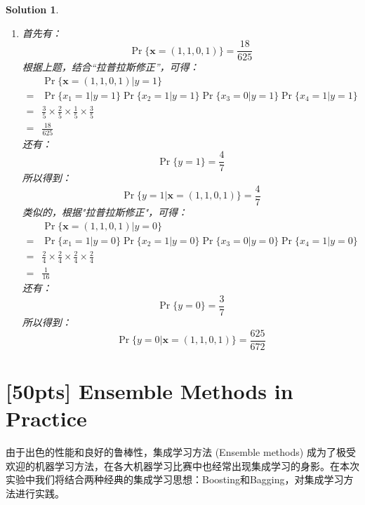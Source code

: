 \documentclass[a4paper,UTF8]{article}
\numberwithin{equation}{section}
\newtheorem*{mySol}{Solution}
\begin{document}
\begin{mySol}
\begin{enumerate}[ {(}1{)}]
\item 
首先有：
\begin{equation}
\Pr\{\mathbf{x}=(1,1,0,1)\} = \frac{18}{625}
\end{equation}
根据上题，结合“拉普拉斯修正”，可得：
\begin{equation}
\begin{aligned}
&\Pr\{\mathbf{x}=(1,1,0,1) | y=1  \}\\ 
=& \Pr\{x_1 = 1 | y = 1\}\Pr\{x_2 = 1 | y = 1\}\Pr\{x_3 = 0 | y = 1\}\Pr\{x_4 = 1 | y = 1\}\\
=& \frac{3}{5}\times\frac{2}{5}\times\frac{1}{5}\times\frac{3}{5}\\
=& \frac{18}{625}
\end{aligned}
\end{equation}
还有：
\begin{equation}
\Pr\{y=1\} = \frac{4}{7}
\end{equation}
所以得到：
\begin{equation}
\Pr\{ y=1 | \mathbf{x}=(1,1,0,1) \} = \frac{4}{7}
\end{equation}
类似的，根据"拉普拉斯修正"，可得：
\begin{equation}
\begin{aligned}
&\Pr\{\mathbf{x}=(1,1,0,1) | y=0  \}\\ 
=& \Pr\{x_1 = 1 | y = 0\}\Pr\{x_2 = 1 | y = 0\}\Pr\{x_3 = 0 | y = 0\}\Pr\{x_4 = 1 | y = 0\}\\
=& \frac{2}{4}\times\frac{2}{4}\times\frac{2}{4}\times\frac{2}{4}\\
=& \frac{1}{16}
\end{aligned}
\end{equation}
还有：
\begin{equation}
\Pr\{y=0\} = \frac{3}{7}
\end{equation}
所以得到：
\begin{equation}
\Pr\{ y=0 | \mathbf{x}=(1,1,0,1) \} = \frac{625}{672}
\end{equation}
\end{enumerate}	

\end{mySol}
\newpage	
\section{[50pts] Ensemble Methods in Practice}

由于出色的性能和良好的鲁棒性，集成学习方法 (Ensemble methods) 成为了极受欢迎的机器学习方法，在各大机器学习比赛中也经常出现集成学习的身影。在本次实验中我们将结合两种经典的集成学习思想：Boosting和Bagging，对集成学习方法进行实践。
\end{document}
